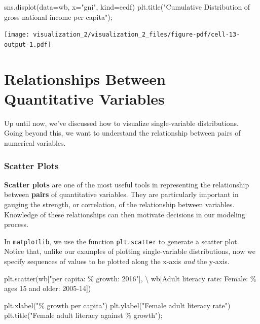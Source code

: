\documentclass[
  letterpaper,
  DIV=11,
  numbers=noendperiod]{scrreprt}
\newenvironment{Shaded}{\begin{snugshade}}{\end{snugshade}}
\newcommand{\NormalTok}[1]{\textcolor[rgb]{0.00,0.23,0.31}{#1}}
\newcommand{\OperatorTok}[1]{\textcolor[rgb]{0.37,0.37,0.37}{#1}}
\newcommand{\SpecialCharTok}[1]{\textcolor[rgb]{0.37,0.37,0.37}{#1}}
\newcommand{\StringTok}[1]{\textcolor[rgb]{0.13,0.47,0.30}{#1}}
\begin{document}
\begin{Shaded}
\begin{Highlighting}[]
\NormalTok{sns.displot(data}\OperatorTok{=}\NormalTok{wb, }
\NormalTok{            x}\OperatorTok{=}\StringTok{"gni"}\NormalTok{, }
\NormalTok{            kind}\OperatorTok{=}\StringTok{\textquotesingle{}ecdf\textquotesingle{}}\NormalTok{)}
\NormalTok{plt.title(}\StringTok{"Cumulative Distribution of gross national income per capita"}\NormalTok{)}\OperatorTok{;}
\end{Highlighting}
\end{Shaded}

\texttt{[image: visualization\_2/visualization\_2\_files/figure-pdf/cell-13-output-1.pdf]}

\section{Relationships Between Quantitative
Variables}\label{relationships-between-quantitative-variables}

Up until now, we've discussed how to visualize single-variable
distributions. Going beyond this, we want to understand the relationship
between pairs of numerical variables.

\subsubsection{Scatter Plots}\label{scatter-plots}

\textbf{Scatter plots} are one of the most useful tools in representing
the relationship between \textbf{pairs} of quantitative variables. They
are particularly important in gauging the strength, or correlation, of
the relationship between variables. Knowledge of these relationships can
then motivate decisions in our modeling process.

In \texttt{matplotlib}, we use the function \texttt{plt.scatter} to
generate a scatter plot. Notice that, unlike our examples of plotting
single-variable distributions, now we specify sequences of values to be
plotted along the x-axis \emph{and} the y-axis.

\begin{Shaded}
\begin{Highlighting}[]
\NormalTok{plt.scatter(wb[}\StringTok{"per capita: }\SpecialCharTok{\% g}\StringTok{rowth: 2016"}\NormalTok{], }\OperatorTok{\textbackslash{}}
\NormalTok{            wb[}\StringTok{\textquotesingle{}Adult literacy rate: Female: \% ages 15 and older: 2005{-}14\textquotesingle{}}\NormalTok{])}

\NormalTok{plt.xlabel(}\StringTok{"}\SpecialCharTok{\% g}\StringTok{rowth per capita"}\NormalTok{)}
\NormalTok{plt.ylabel(}\StringTok{"Female adult literacy rate"}\NormalTok{)}
\NormalTok{plt.title(}\StringTok{"Female adult literacy against }\SpecialCharTok{\% g}\StringTok{rowth"}\NormalTok{)}\OperatorTok{;}
\end{Highlighting}
\end{Shaded}
\end{document}
